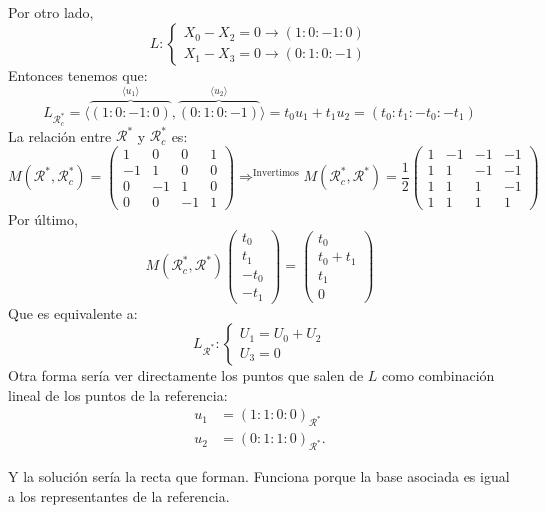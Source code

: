 \documentclass[10pt,a4paper,openright]{book}
\theoremstyle{break}
\begin{document}
Por otro lado, 
\[
L : \begin{cases}
    X_0 - X_2 = 0 \rightarrow \left( 1 : 0 : -1 : 0 \right) \\
    X_1 - X_3 = 0 \rightarrow \left( 0 : 1 : 0 : -1 \right) 
\end{cases} 
\]
Entonces tenemos que: 
\[
L_{\mathcal{R}_c^*} = \langle \overbrace{\left( 1 : 0 : -1 : 0 \right)}^{\langle u_1 \rangle}, \overbrace{\left( 0 : 1 : 0 : -1 \right)}^{\langle u_2 \rangle} \rangle = t_0 u_1 + t_1u_2 = \left( t_0 : t_1 : -t_0 : -t_1 \right) 
\]
La relación entre $\mathcal{R}^*$ y $\mathcal{R}_c^*$ es:
\[
    M\left( \mathcal{R}^*, \mathcal{R}_c^* \right) = \begin{pmatrix} 1 & 0 & 0 & 1\\ -1 & 1 & 0 & 0\\ 0 & -1 & 1 & 0\\ 0 & 0 & -1 & 1 \end{pmatrix} \Rightarrow^{\text{Invertimos}} M\left( \mathcal{R}_c^*, \mathcal{R}^* \right) = \frac{1}{2} \begin{pmatrix} 1 & -1 & -1 & -1\\ 1 & 1 & -1 & -1\\ 1 & 1 & 1 & -1\\ 1 & 1 & 1 & 1 \end{pmatrix}
\]
Por último,
\[
M\left( \mathcal{R}_c^*, \mathcal{R}^* \right) \begin{pmatrix} t_0\\ t_1\\ -t_0\\ -t_1 \end{pmatrix} = \begin{pmatrix} t_0\\ t_0 + t_1\\ t_1\\ 0 \end{pmatrix} 
\]
Que es equivalente a: 
\[
L_{\mathcal{R}^*} : \begin{cases}
    U_1 = U_0 + U_2\\
    U_3 = 0
\end{cases} 
\]
Otra forma sería ver directamente los puntos que salen de $L$ como combinación lineal de los puntos de la referencia:
\begin{align*}
    u_1 &= \left( 1 : 1 : 0 : 0 \right)_{\mathcal{R}^*} \\
    u_2 &= \left( 0 : 1 : 1 : 0 \right)_{\mathcal{R}^*} 
.\end{align*}

Y la solución sería la recta que forman. Funciona porque la base asociada es igual a los representantes de la referencia.
\end{document}
